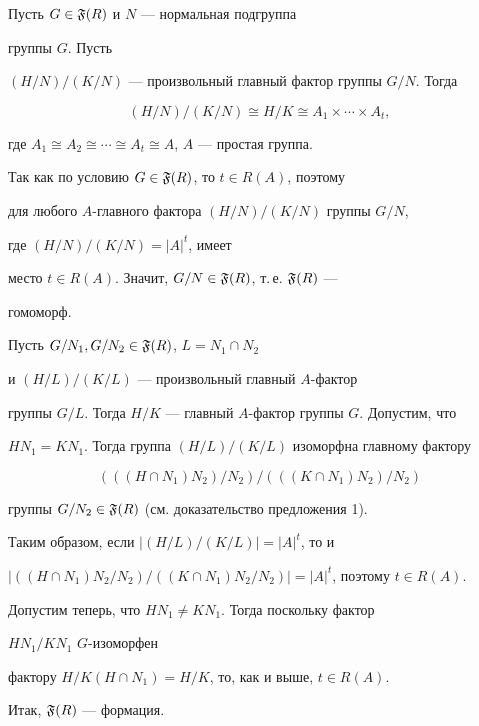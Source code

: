\begin{pf}


Пусть $G\in\frak{F}(R)$ и $N$ --- нормальная подгруппа


группы $G$. Пусть\linebreak


$(H/N)/(K/N)$ --- произвольный главный фактор группы $G/N$. Тогда


$$


(H/N)/(K/N)\cong H/K\cong A_1\times\dotsb\times A_t,


$$


где $A_1\cong A_2\cong\dotsb\cong A_t\cong A$, $A$ --- простая группа.


Так как по условию $G\in\frak{F}(R)$, то $t\in R(A)$, поэтому


для любого $A$-главного фактора $(H/N)/(K/N)$ группы $G/N$,


где $(H/N)/(K/N)=|A|^t$, имеет


место $t\in R(A)$. Значит, $G/N\in\frak{F}(R)$, т.\,е. $\frak{F}(R)$ ---


гомоморф.





Пусть $G/N_1,G/N_2\in\frak{F}(R)$, $L=N_1\cap N_2$


и $(H/L)/(K/L)$ --- произвольный главный $A$-фактор


группы $G/L$. Тогда $H/K$ --- главный $A$-фактор группы $G$. Допустим, что


$HN_1=KN_1$. Тогда группа $(H/L)/(K/L)$ изоморфна главному фактору


$$


(((H\cap N_1)N_2)/N_2)/(((K\cap N_1)N_2)/N_2)


$$


группы $G/N_2\in\frak{F}(R)$ (см. доказательство предложения 1).





Таким образом, если $|(H/L)/(K/L)|=|A|^t$, то и


$|((H\cap N_1)N_2/N_2)/((K\cap N_1)N_2/N_2)|=|A|^t$, поэтому $t\in R(A)$.


Допустим теперь, что $HN_1\ne KN_1$. Тогда поскольку фактор


$HN_1/KN_1$\; $G$-изоморфен


фактору $H/K(H\cap N_1)=H/K$, то, как и выше, $t\in R(A)$.


Итак, $\frak{F}(R)$ --- формация.






\end{pf}
